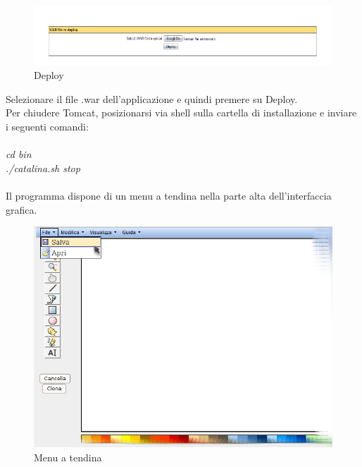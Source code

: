 \newpage
\begin{figure}[!ht]
\centering
\includegraphics[scale=0.7]{images/DeployTomcat.png}
\caption{Deploy}
\end{figure}
 
Selezionare il file .war dell'applicazione e quindi premere su Deploy.\\
Per chiudere Tomcat, posizionarsi via shell sulla cartella di installazione e inviare i seguenti comandi:\\
\\
\textit{cd bin}\\
\textit{./catalina.sh stop}\\
\\
\newpage
Il programma dispone di un menu a tendina nella parte alta dell'interfaccia grafica.
 
\begin{figure}[!ht]
\centering
\includegraphics[scale=0.4]{images/menu.png}
\caption{Menu a tendina}
\end{figure}
 
